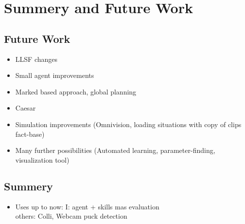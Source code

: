 \documentclass[a4paper,11pt]{article}
\begin{document}
\section{Summery and Future Work}
\subsection{Future Work}
\begin{itemize}
\item LLSF changes
\item Small agent improvements
\item Marked based approach, global planning
\item Caesar
\item Simulation improvements (Omnivision, loading situations with copy of clips fact-base)
\item Many further possibilities (Automated learning, parameter-finding, visualization tool)
\end{itemize}
\subsection{Summery}
\begin{itemize}
\item Uses up to now: I: agent + skills mas evaluation\\
others: Colli, Webcam puck detection
\end{itemize}



\end{document}
